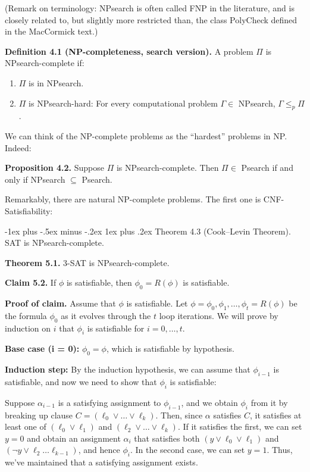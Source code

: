 \documentclass[10pt,landscape]{article}
\makeatletter
\renewcommand{\subsubsection}{\@startsection{subsubsection}{3}{0mm}%
                                {-1ex plus -.5ex minus -.2ex}%
                                {1ex plus .2ex}%
                                {\normalfont\small\bfseries}}
\makeatother
\begin{document}
\begin{multicols*}{3}
(Remark on terminology: NPsearch is often called FNP in the literature, and is closely related to, but slightly more restricted than, the class PolyCheck defined in the MacCormick text.)

\textbf{Definition 4.1 (NP-completeness, search version).} A problem $\Pi$ is NPsearch-complete if:
\begin{enumerate}
  \item $\Pi$ is in NPsearch.
  \item $\Pi$ is NPsearch-hard: For every computational problem $\Gamma \in$ NPsearch, $\Gamma \leq_p \Pi$.
\end{enumerate}

We can think of the NP-complete problems as the “hardest” problems in NP. Indeed:

\textbf{Proposition 4.2.} Suppose $\Pi$ is NPsearch-complete. Then $\Pi \in$ Psearch if and only if NPsearch $\subseteq$ Psearch.

Remarkably, there are natural NP-complete problems. The first one is CNF-Satisfiability:

\subsubsection{Theorem 4.3 (Cook–Levin Theorem).} SAT is NPsearch-complete.

\smallskip

\textbf{Theorem 5.1.} 3-SAT is NPsearch-complete.

\textbf{Claim 5.2.} If $\phi$ is satisfiable, then $\phi_0 = R(\phi)$ is satisfiable.

\textbf{Proof of claim.} Assume that $\phi$ is satisfiable. Let $\phi = \phi_0, \phi_1, \ldots, \phi_t = R(\phi)$ be the formula $\phi_0$ as it evolves through the $t$ loop iterations. We will prove by induction on $i$ that $\phi_i$ is satisfiable for $i = 0, \ldots, t$.

\textbf{Base case (i = 0):} $\phi_0 = \phi$, which is satisfiable by hypothesis.

\textbf{Induction step:} By the induction hypothesis, we can assume that $\phi_{i-1}$ is satisfiable, and now we need to show that $\phi_i$ is satisfiable:

Suppose $\alpha_{i-1}$ is a satisfying assignment to $\phi_{i-1}$, and we obtain $\phi_i$ from it by breaking up clause $C = (\ell_0 \lor \ldots \lor \ell_k)$. Then, since $\alpha$ satisfies $C$, it satisfies at least one of $(\ell_0 \lor \ell_1)$ and $(\ell_2 \lor \ldots \lor \ell_k)$. If it satisfies the first, we can set $y = 0$ and obtain an assignment $\alpha_i$ that satisfies both $(y \lor \ell_0 \lor \ell_1)$ and $(\neg y \lor \ell_2 \ldots \ell_{k-1})$, and hence $\phi_i$. In the second case, we can set $y = 1$. Thus, we've maintained that a satisfying assignment exists.


\end{multicols*}
\end{document}
